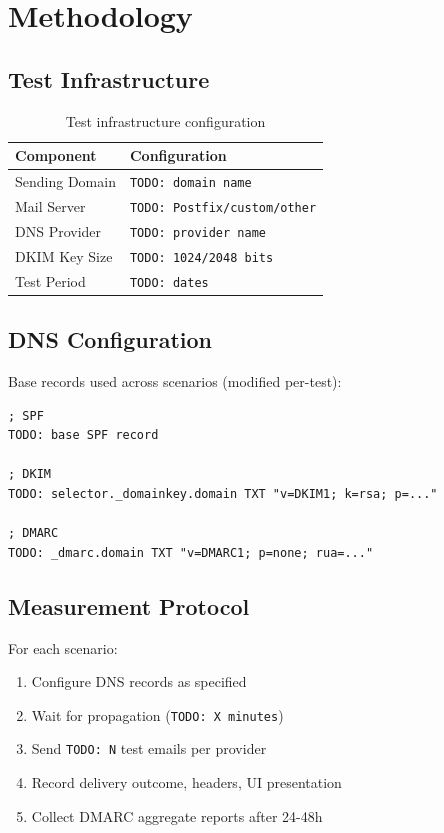 \documentclass[11pt,a4paper]{article}
\begin{document}
\section{Methodology}

\subsection{Test Infrastructure}

\begin{table}[h]
\centering
\begin{tabular}{ll}
\toprule
\textbf{Component} & \textbf{Configuration} \\
\midrule
Sending Domain & \texttt{TODO: domain name} \\
Mail Server & \texttt{TODO: Postfix/custom/other} \\
DNS Provider & \texttt{TODO: provider name} \\
DKIM Key Size & \texttt{TODO: 1024/2048 bits} \\
Test Period & \texttt{TODO: dates} \\
\bottomrule
\end{tabular}
\caption{Test infrastructure configuration}
\end{table}

\subsection{DNS Configuration}

Base records used across scenarios (modified per-test):

\begin{lstlisting}
; SPF
TODO: base SPF record

; DKIM
TODO: selector._domainkey.domain TXT "v=DKIM1; k=rsa; p=..."

; DMARC
TODO: _dmarc.domain TXT "v=DMARC1; p=none; rua=..."
\end{lstlisting}

\subsection{Measurement Protocol}

For each scenario:
\begin{enumerate}[noitemsep]
    \item Configure DNS records as specified
    \item Wait for propagation (\texttt{TODO: X minutes})
    \item Send \texttt{TODO: N} test emails per provider
    \item Record delivery outcome, headers, UI presentation
    \item Collect DMARC aggregate reports after 24-48h
\end{enumerate}
\end{document}

